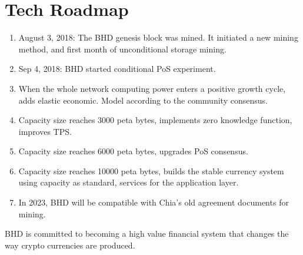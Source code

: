 \chapter{Tech Roadmap}
\begin{enumerate}
    \item August 3, 2018: The BHD genesis block was mined. It initiated a new mining method, and first month of unconditional storage mining.
    \item Sep 4, 2018: BHD started conditional PoS experiment.
    \item When the whole network computing power enters a positive growth cycle, adds elastic economic. Model according to the community consensus.
    \item Capacity size reaches 3000 peta bytes, implements zero knowledge function, improves TPS.
    \item Capacity size reaches 6000 peta bytes, upgrades PoS consensus.
    \item Capacity size reaches 10000 peta bytes, builds the stable currency system using capacity as standard, services for the application layer.
    \item In 2023, BHD will be compatible with Chia's old agreement documents for mining.
\end{enumerate}
\begin{flushleft}
    BHD is committed to becoming a high value financial system that changes the way crypto currencies are produced.
\end{flushleft}
